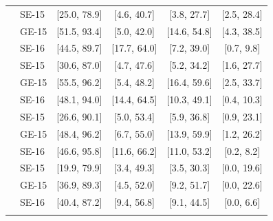 \begin{table}[!htb]
\begin{tabular}{ll cccc}
\addlinespace[2pt]
\multirow{3}{*}{\textbf{40--49}} & SE-15 & [25.0, 78.9] & [4.6, 40.7] & [3.8, 27.7] & [2.5, 28.4] \\
 & GE-15 & [51.5, 93.4] & [5.0, 42.0] & [14.6, 54.8] & [4.3, 38.5] \\
 & SE-16 & [44.5, 89.7] & [17.7, 64.0] & [7.2, 39.0] & [0.7, 9.8] \\
\addlinespace[2pt]
\multirow{3}{*}{\textbf{50--59}} & SE-15 & [30.6, 87.0] & [4.7, 47.6] & [5.2, 34.2] & [1.6, 27.7] \\
 & GE-15 & [55.5, 96.2] & [5.4, 48.2] & [16.4, 59.6] & [2.5, 33.7] \\
 & SE-16 & [48.1, 94.0] & [14.4, 64.5] & [10.3, 49.1] & [0.4, 10.3] \\
\addlinespace[2pt]
\multirow{3}{*}{\textbf{60--69}} & SE-15 & [26.6, 90.1] & [5.0, 53.4] & [5.9, 36.8] & [0.9, 23.1] \\
 & GE-15 & [48.4, 96.2] & [6.7, 55.0] & [13.9, 59.9] & [1.2, 26.2] \\
 & SE-16 & [46.6, 95.8] & [11.6, 66.2] & [11.0, 53.2] & [0.2, 8.2] \\
\addlinespace[2pt]
\multirow{3}{*}{\textbf{70+}} & SE-15 & [19.9, 79.9] & [3.4, 49.3] & [3.5, 30.3] & [0.0, 19.6] \\
 & GE-15 & [36.9, 89.3] & [4.5, 52.0] & [9.2, 51.7] & [0.0, 22.6] \\
 & SE-16 & [40.4, 87.2] & [9.4, 56.8] & [9.1, 44.5] & [0.0, 6.6] \\
\addlinespace[2pt]
\bottomrule
\end{tabular}
\end{table}
